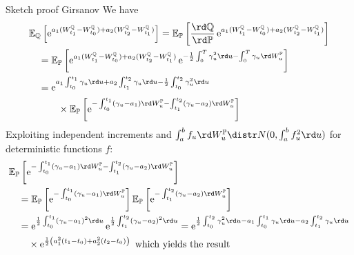 \documentclass[pdf, handout]{beamer}
\newcommand{\e}{\operatorname{e}}
\begin{document}
\begin{frame}{Sketch proof Girsanov}
We  have 
\begin{align*}
&\mathbb{E}_{\mathbb{Q}}\left[ \e^{a_1 (W_{t_1}^{\mathbb{Q}} - W_{t_0}^{\mathbb{Q}}) + a_2 (W^{\mathbb{Q}}_{t_2} - W^{\mathbb{Q}}_{t_1})}\right]= 
\mathbb{E}_{\mathbb{P}}\left[\frac{\rd\mathbb{Q}}{\rd\mathbb{P}} \e^{a_1 (W_{t_1}^{\mathbb{Q}} - W^{\mathbb{Q}}_{t_0}) + a_2 (W^{\mathbb{Q}}_{t_2} - W^{\mathbb{Q}}_{t_1})}\right] \\
 &\quad=
\mathbb{E}_{\mathbb{P}}\left[
\e^{a_1 (W^{\mathbb{Q}}_{t_1} - W^{\mathbb{Q}}_{t_0}) + a_2 (W^{\mathbb{Q}}_{t_2} - W^{\mathbb{Q}}_{t_1})}
\e^{-\frac{1}{2}\int_0^T \gamma_u^2 \rd u - \int_0^T \gamma_u \rd W^{\mathbb{P}}_u}
\right] \\
 &\quad=
\e^{
a_1 \int_{t_0}^{t_1} \gamma_u \rd u + a_2 \int_{t_1}^{t_2} \gamma_u \rd u 
-\frac{1}{2}\int_{t_0}^{t_2} \gamma_u^2  \rd u} \\
&\qquad\quad \times
\mathbb{E}_{\mathbb{P}}\left[
\e^{ 
-\int_{t_0}^{t_1} ( \gamma_u - a_1)  \rd W^{\mathbb{P}}_u
-\int_{t_1}^{t_2} (\gamma_u - a_2)  \rd W^{\mathbb{P}}_u
}
\right]
\end{align*}
Exploiting independent increments and  
$\int_a^b f_u \rd W^{\mathbb{P}}_u \distr N( 0, \int_a^b f_u^2 \rd u)$ for deterministic functions $f$:
\begin{align*}
& \mathbb{E}_{\mathbb{P}}\left[
\e^{ 
-\int_{t_0}^{t_1} ( \gamma_u - a_1)  \rd W^{\mathbb{P}}_u
-\int_{t_1}^{t_2} (\gamma_u - a_2)  \rd W^{\mathbb{P}}_u
}
\right] \\
&\quad =
\mathbb{E}_{\mathbb{P}}
\left[
\e^{ 
-\int_{t_0}^{t_1} ( \gamma_u - a_1)  \rd W^{\mathbb{P}}_u }
\right]
\mathbb{E}_{\mathbb{P}}
\left[\e^{ 
-\int_{t_1}^{t_2} ( \gamma_u - a_2)  \rd W^{\mathbb{P}}_u}\right]
\\
&\quad
= \e^{
\frac{1}{2} \int_{t_0}^{t_1} ( \gamma_u - a_1)^2 \rd u
}\e^{
\frac{1}{2} \int_{t_1}^{t_2} ( \gamma_u - a_2)^2 \rd u
}  = \e^{\frac{1}{2}\int_{t_0}^{t_2} \gamma_u^2 \rd u 
- a_1 \int_{t_0}^{t_1} \gamma_u \rd u 
- a_2 \int_{t_1}^{t_2} \gamma_u \rd u
} \\
&\qquad \times \e^{\frac{1}{2}\left( a_1^2 (t_1-t_0) + a_2^2 (t_2- t_0)\right)
} \text{ which yields the result}
\end{align*}
\end{frame}
\end{document}
